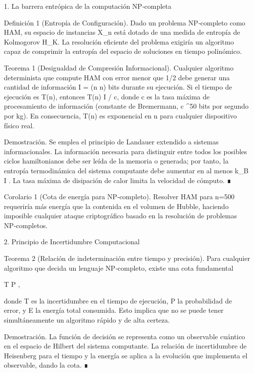 \documentclass[12pt,twoside]{book}
\begin{document}
1. La barrera entrópica de la computación NP‑completa

Definición 1 (Entropía de Configuración). Dado un problema NP‑completo como HAM, su espacio de instancias X_n está dotado de una medida de entropía de Kolmogorov H_K. La resolución eficiente del problema exigiría un algoritmo capaz de comprimir la entropía del espacio de soluciones en tiempo polinómico.

Teorema 1 (Desigualdad de Compresión Informacional). Cualquier algoritmo determinista que compute HAM con error menor que 1/2 debe generar una cantidad de información I = \Omega(n \log n) bits durante su ejecución. Si el tiempo de ejecución es T(n), entonces T(n) \geq I / c, donde c es la tasa máxima de procesamiento de información (constante de Bremermann, c  ^{50} bits por segundo por kg). En consecuencia, T(n) es exponencial en n para cualquier dispositivo físico real.

Demostración. Se emplea el principio de Landauer extendido a sistemas informacionales. La información necesaria para distinguir entre todos los posibles ciclos hamiltonianos debe ser leída de la memoria o generada; por tanto, la entropía termodinámica del sistema computante debe aumentar en al menos k_B I . La tasa máxima de disipación de calor limita la velocidad de cómputo. ∎

Corolario 1 (Cota de energía para NP‑completo). Resolver HAM para n=500 requeriría más energía que la contenida en el volumen de Hubble, haciendo imposible cualquier ataque criptográfico basado en la resolución de problemas NP‑completos.

2. Principio de Incertidumbre Computacional

Teorema 2 (Relación de indeterminación entre tiempo y precisión). Para cualquier algoritmo que decida un lenguaje NP‑completo, existe una cota fundamental

\Delta T \cdot \Delta P \geq {},

donde \Delta T es la incertidumbre en el tiempo de ejecución, \Delta P la probabilidad de error, y E la energía total consumida. Esto implica que no se puede tener simultáneamente un algoritmo rápido y de alta certeza.

Demostración. La función de decisión se representa como un observable cuántico en el espacio de Hilbert del sistema computante. La relación de incertidumbre de Heisenberg para el tiempo y la energía se aplica a la evolución que implementa el observable, dando la cota. ∎
\end{document}
